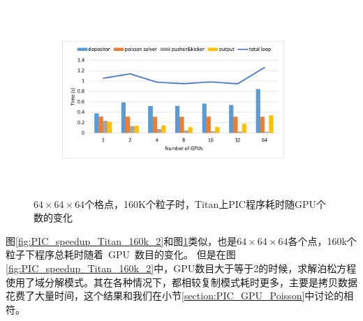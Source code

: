 \begin{figure}[!htb]
  \centering
  \includegraphics[width=0.9\textwidth]{Img/PIC_speedup_Titan_160k_1.pdf}
  \caption{$64 \times 64 \times 64$个格点，160K个粒子时，Titan上PIC程序耗时随GPU个数的变化}
  \label{fig:PIC_speedup_Titan_160k_1}
\end{figure}

图\ref{fig:PIC_speedup_Titan_160k_2}和图\ref{fig:PIC_speedup_Titan_160k_1}类似，也是$64 \times 64 \times 64$各个点，160k个粒子下程序总耗时随着~GPU~数目的变化。
但是在图\ref{fig:PIC_speedup_Titan_160k_2}中，GPU数目大于等于2的时候，求解泊松方程使用了域分解模式。其在各种情况下，都相较复制模式耗时更多，主要是拷贝数据花费了大量时间，这个结果和我们在小节\ref{section:PIC_GPU_Poisson}中讨论的相符。

